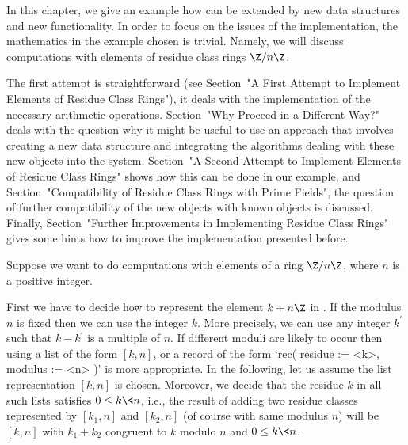 

In this chapter, we give an example how {\GAP} can be extended
by new data structures and new functionality.
In order to focus on the issues of the implementation,
the mathematics in the example chosen is trivial.
Namely, we will discuss computations with elements of residue class rings
$\Z/n\Z$.

The first attempt is straightforward (see Section~"A First Attempt to
Implement Elements of Residue Class Rings"),
it deals with the implementation of the necessary arithmetic operations.
Section~"Why Proceed in a Different Way?" deals with the question
why it might be useful to use an approach that involves creating a new
data structure and integrating the algorithms dealing with these new
{\GAP} objects into the system.
Section~"A Second Attempt to Implement Elements of Residue Class Rings"
shows how this can be done in our example,
and Section~"Compatibility of Residue Class Rings with Prime Fields",
the question of further compatibility of the new objects with known
{\GAP} objects is discussed.
Finally, Section~"Further Improvements in Implementing Residue Class Rings"
gives some hints how to improve the implementation presented before.



Suppose we want to do computations with elements of a ring $\Z/n\Z$,
where $n$ is a positive integer.

First we have to decide how to represent the element $k + n\Z$ in {\GAP}.
If the modulus $n$ is fixed then we can use the integer $k$.
More precisely, we can use any integer $k^{\prime}$
such that $k - k^{\prime}$ is a multiple of $n$.
If different moduli are likely to occur then using a list of the form
$[ k, n ]$, or a record of the form `rec( residue := <k>, modulus := <n> )'
is more appropriate.
In the following, let us assume the list representation $[ k, n ]$ is
chosen.
Moreover, we decide that the residue $k$ in all such lists satisfies
$0 \le k \< n$,
i.e., the result of adding two residue classes represented by
$[ k_1, n ]$ and $[ k_2, n ]$ (of course with same modulus $n$)
will be $[ k, n ]$ with $k_1 + k_2$ congruent to $k$ modulo $n$
and $0 \le k \< n$.

